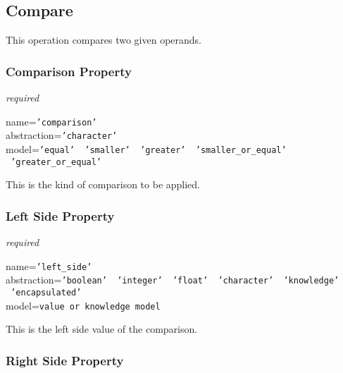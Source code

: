 %
%
%
%
%
%

\subsection{Compare}
\label{compare_heading}

This operation compares two given operands.

\subsubsection{Comparison Property}

\emph{required}

name=\texttt{'comparison'}\\
abstraction=\texttt{'character'}\\
model=\texttt{'equal' \vline\ 'smaller' \vline\ 'greater' \vline\ 'smaller\_or\_equal' \vline\ 'greater\_or\_equal'}

This is the kind of comparison to be applied.

\subsubsection{Left Side Property}

\emph{required}

name=\texttt{'left\_side'}\\
abstraction=\texttt{'boolean' \vline\ 'integer' \vline\ 'float' \vline\ 'character' \vline\ 'knowledge' \vline\ 'encapsulated'}\\
model=\texttt{value or knowledge model}

This is the left side value of the comparison.

\subsubsection{Right Side Property}

